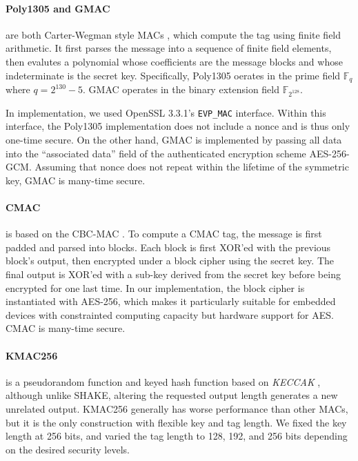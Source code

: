 \documentclass[runningheads]{llncs}
\begin{document}
\paragraph{Poly1305 \cite{DBLP:conf/fse/Bernstein05} and GMAC \cite{NIST80038D}} are both Carter-Wegman style MACs \cite{DBLP:journals/jcss/CarterW79,DBLP:journals/jcss/WegmanC81}, which compute the tag using finite field arithmetic. It first parses the message into a sequence of finite field elements, then evalutes a polynomial whose coefficients are the message blocks and whose indeterminate is the secret key. Specifically, Poly1305 oerates in the prime field $\mathbb{F}_q$ where $q = 2^{130} - 5$. GMAC operates in the binary extension field $\mathbb{F}_{2^{128}}$.

In implementation, we used OpenSSL 3.3.1's \texttt{EVP\_MAC} interface. Within this interface, the Poly1305 implementation does not include a nonce and is thus only one-time secure. On the other hand, GMAC is implemented by passing all data into the ``associated data'' field of the authenticated encryption scheme AES-256-GCM. Assuming that nonce does not repeat within the lifetime of the symmetric key, GMAC is many-time secure.

\paragraph{CMAC \cite{NIST80038B}} is based on the CBC-MAC \cite{DBLP:conf/crypto/BlackR00}. To compute a CMAC tag, the message is first padded and parsed into blocks. Each block is first XOR'ed with the previous block's output, then encrypted under a block cipher using the secret key. The final output is XOR'ed with a sub-key derived from the secret key before being encrypted for one last time. In our implementation, the block cipher is instantiated with AES-256, which makes it particularly suitable for embedded devices with constrainted computing capacity but hardware support for AES. CMAC is many-time secure.

\paragraph{KMAC256 \cite{NIST800185}} is a pseudorandom function and keyed hash function based on \textit{KECCAK} \cite{NISTFIPS202}, although unlike SHAKE, altering the requested output length generates a new unrelated output. KMAC256 generally has worse performance than other MACs, but it is the only construction with flexible key and tag length. We fixed the key length at 256 bits, and varied the tag length to 128, 192, and 256 bits depending on the desired security levels.
\end{document}
